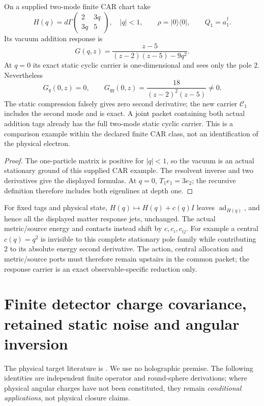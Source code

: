 \documentclass[12pt,a4paper]{article}
\begin{document}
\begin{proposition}
\label{p4:prop:v251-dark-sector-second-return}
On a supplied two-mode finite CAR chart take
\[
 H(q)=d\Gamma\begin{pmatrix}2&3q\\3q&5\end{pmatrix},\quad |q|<1,
 \qquad \rho=|0\rangle\langle0|,\qquad Q_1=a_1^\dagger.
\]
Its vacuum addition response is
\[
 G(q,z)=\frac{z-5}{(z-2)(z-5)-9q^2}.
\]
At $q=0$ its exact static cyclic carrier is one-dimensional and sees
only the pole $2$. Nevertheless
\[
 G_q(0,z)=0,\qquad
 \boxed{G_{qq}(0,z)=\frac{18}{(z-2)^2(z-5)}\ne0.}
\]
The static compression falsely gives zero second derivative; the new
carrier $\mathscr C_1$ includes the second mode and is exact. A joint
packet containing both actual addition tags already has the full two-mode
static cyclic carrier. This is a comparison example within the declared
finite CAR class, not an identification of the physical electron.
\end{proposition}
\begin{proof}
The one-particle matrix is positive for $|q|<1$, so the vacuum is an actual
stationary ground of this supplied CAR example. The resolvent inverse and
two derivatives give the displayed formulas. At $q=0$, $T_1e_1=3e_2$;
the recursive definition therefore includes both eigenlines at depth one.
\end{proof}

\begin{remark}
For fixed tags and physical state, $H(q)\mapsto H(q)+c(q)I$ leaves
$\operatorname{ad}_{H(q)}$, and hence all the displayed matter response
jets, unchanged. The actual metric/source energy and contacts instead
shift by $c,c_i,c_{ij}$. For example a central $c(q)=q^2$ is invisible
to this complete stationary pole family while contributing $2$ to its
absolute energy second derivative. The action, central allocation and
metric/source ports must therefore remain upstairs in the common packet;
the response carrier is an exact observable-specific reduction only.
\end{remark}



\section{Finite detector charge covariance, retained static noise and angular inversion}
\label{p4c:sec:v254-detector-technical}
The physical target literature is
\cite{MoultNarayananPasterski2026MemoryCorrelators,OertelMoultPasterski2026Detectors,PasterskiStromingerZhiboedov2016Memory,JorstadPasterski2026SoftOmissions,Pasterski2023NoetherCurrents}.
We use no holographic premise. The following identities are independent
finite operator and round-sphere derivations; where physical angular
charges have not been constituted, they remain \emph{conditional
applications}, not physical closure claims.
\end{document}

